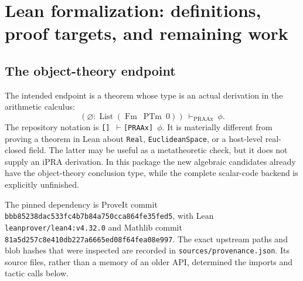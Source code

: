 \section{Lean formalization: definitions, proof targets, and remaining work}
\label{sec:formalization}
\subsection{The object-theory endpoint}
The intended endpoint is a theorem whose type is an actual derivation in
the arithmetic calculus:
\[
       (\varnothing:\operatorname{List}(\operatorname{Fm}\ \operatorname{PTm}\ 0))
               \ \vdash_{\operatorname{PRAAx}}\ \phi.
\]
The repository notation is \texttt{[] $\vdash$[PRAAx] $\phi$}.
It is materially different from proving a theorem in Lean about
\texttt{Real}, \texttt{EuclideanSpace}, or a host-level real-closed field.
The latter may be useful as a metatheoretic check, but it does not supply
an iPRA derivation. In this package the new algebraic candidates already
have the object-theory conclusion type, while the complete scalar-code
backend is explicitly unfinished.

The pinned dependency is ProveIt commit
\nolinkurl{bbb85238dac533fc4b7b84a750cca864fe35fed5}, with Lean
\texttt{leanprover/lean4:v4.32.0} and Mathlib commit
\nolinkurl{81a5d257c8e410db227a6665ed08f64fea08e997}.
The exact upstream paths and blob hashes that were inspected are recorded
in \nolinkurl{sources/provenance.json}. Its source files, rather than a
memory of an older API, determined the imports and tactic calls below.

